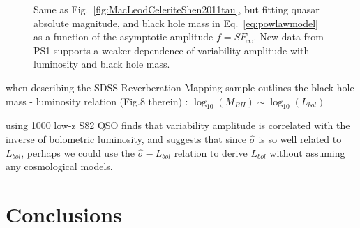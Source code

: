 \documentclass[twocolumn]{aastex62}
\begin{document}
\begin{figure*}
\caption{Same as Fig.~\ref{fig:MacLeodCeleriteShen2011tau},  but fitting quasar absolute magnitude, and black hole mass  in Eq.~\ref{eq:powlawmodel} as a function of the asymptotic amplitude $f = SF_{\infty}$. New data from PS1 supports a weaker dependence of variability amplitude with luminosity and black hole mass. }
\label{fig:MacLeodCeleriteShen2011sf}
\end{figure*} 



\cite{shen2018} when describing the SDSS Reverberation Mapping sample outlines the black hole mass - luminosity relation (Fig.8 therein) : $\log_{10}(M_{BH}) \sim \log_{10}{(L_{bol})}$


\cite{sun2018} using 1000 low-z S82 QSO finds that variability amplitude is correlated with the inverse of bolometric luminosity, and suggests that since $\hat{\sigma}$ is so well related to $L
_{bol}$, perhaps we could use the $\hat{\sigma} - L_{bol}$ relation to derive $L_{bol}$ without assuming any cosmological models. 



%
%
%
%
%
%

\section{Conclusions}





 


\end{document}
